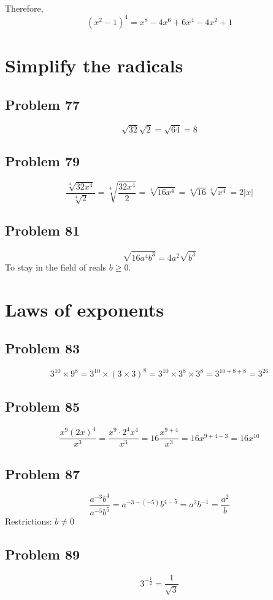 \documentclass[11pt, oneside]{article}   	%
\begin{document}
\noindent Therefore,
$$(x^2 - 1)^4 = x^8-4 x^6+6 x^4-4 x^2+1$$

\section{Simplify the radicals}

\subsection{Problem 77}
$$\sqrt{32}\sqrt{2} = \sqrt{64} = 8$$

\subsection{Problem 79}

$$\frac{\sqrt[4]{32 x^4}}{\sqrt[4]{2}} 
= \sqrt[4]{\frac{32 x^4}{2}}
= \sqrt[4]{16 x^{4}}
= \sqrt[4]{16}\sqrt[4]{x^{4}}
= 2 \left| x \right|
$$

\subsection{Problem 81}
$$\sqrt{16a^{4}b^{3}} = 4a^{2}\sqrt{b^{3}}$$
To stay in the field of reals $b\ge0$.


\section{Laws of exponents}

\subsection{Problem 83}
$$3^{10}\times 9^{8} 
= 3^{10}\times (3\times3)^{8}
= 3^{10}\times 3^{8}\times 3^{8}
= 3^{10+8+8} = 3^{26}$$

\subsection{Problem 85}
$$\frac{x^9 (2 x)^{4}}{x^3} 
= \frac{x^9 \cdot 2^{4}x^{4}} {x^3}
= 16\frac{x^{9+4}} {x^3}
= 16 x^{9+4-3}
= 16 x^{10}$$

\subsection{Problem 87}
$$\frac{a^{-3}b^{4}} {a^{-5}b^{5}} 
= a^{-3-(-5)}b^{4-5}
= a^{2}b^{-1}
= \frac{a^2}{b}$$
Restrictions: $b\ne0$

\subsection{Problem 89}
$$3^{-\frac{1}{2}} = \frac{1}{\sqrt{3}}$$
\end{document}
